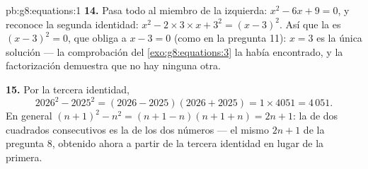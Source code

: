 \begin{solution}{pb:g8:equations:1}
\textbf{14.} Pasa todo al miembro de la izquierda:
$x^2 - 6x + 9 = 0$, y reconoce la segunda identidad:
$x^2 - 2 \times 3 \times x + 3^2 = (x - 3)^2$. Así que la  es
$(x - 3)^2 = 0$, que obliga a $x - 3 = 0$ (como en la pregunta 11):
$x = 3$ es la única solución --- la comprobación del
\cref{exo:g8:equations:3} la había encontrado, y la factorización demuestra
que no hay ninguna otra.

\textbf{15.} Por la tercera identidad,
\[
2026^2 - 2025^2 = (2026 - 2025)(2026 + 2025)
= 1 \times 4051 = 4\,051 .
\]
En general $(n+1)^2 - n^2 = (n + 1 - n)(n + 1 + n) = 2n + 1$: la
 de dos cuadrados consecutivos es la  de los dos
números --- el mismo $2n + 1$ de la pregunta 8, obtenido ahora a partir de
la tercera identidad en lugar de la primera.
\end{solution}
